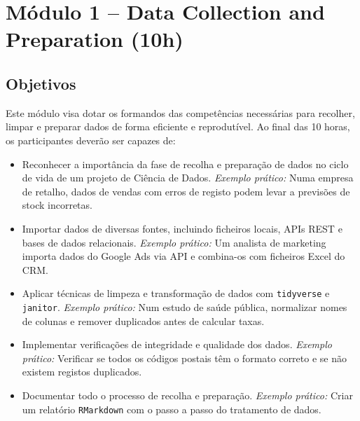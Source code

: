 \section{\textcolor{sectionred}{Módulo 1 – Data Collection and Preparation (10h)}}

\subsection{\textcolor{subsectionblue}{Objetivos}}
Este módulo visa dotar os formandos das competências necessárias para recolher, limpar e preparar dados de forma eficiente e reprodutível. Ao final das 10 horas, os participantes deverão ser capazes de:
\begin{itemize}
  \item Reconhecer a importância da fase de recolha e preparação de dados no ciclo de vida de um projeto de Ciência de Dados.  
  \textit{Exemplo prático:} Numa empresa de retalho, dados de vendas com erros de registo podem levar a previsões de stock incorretas.
  \item Importar dados de diversas fontes, incluindo ficheiros locais, APIs REST e bases de dados relacionais.  
  \textit{Exemplo prático:} Um analista de marketing importa dados do Google Ads via API e combina-os com ficheiros Excel do CRM.
  \item Aplicar técnicas de limpeza e transformação de dados com \texttt{tidyverse} e \texttt{janitor}.  
  \textit{Exemplo prático:} Num estudo de saúde pública, normalizar nomes de colunas e remover duplicados antes de calcular taxas.
  \item Implementar verificações de integridade e qualidade dos dados.  
  \textit{Exemplo prático:} Verificar se todos os códigos postais têm o formato correto e se não existem registos duplicados.
  \item Documentar todo o processo de recolha e preparação.  
  \textit{Exemplo prático:} Criar um relatório \texttt{RMarkdown} com o passo a passo do tratamento de dados.
\end{itemize}

